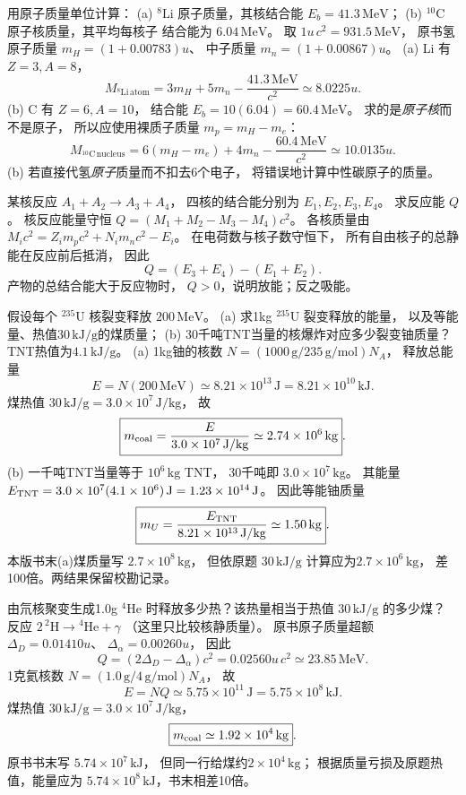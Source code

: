 用原子质量单位计算：
(a) $\mathrm{^{8}Li}$ 原子质量，其核结合能
$E_b=41.3\,\mathrm{MeV}$；
(b) $\mathrm{^{10}C}$ 原子核质量，其平均每核子
结合能为 $6.04\,\mathrm{MeV}$。
\exsolution
取 $1u\,c^2=931.5\,\mathrm{MeV}$，
原书氢原子质量 $m_H=(1+0.00783)u$、
中子质量 $m_n=(1+0.00867)u$。
(a) Li 有 $Z=3,A=8$，
\[
 \boxed{M_{\mathrm{^{8}Li\,atom}}=
 3m_H+5m_n-\frac{41.3\,\mathrm{MeV}}{c^2}
 \simeq8.0225u}.
\]
(b) C 有 $Z=6,A=10$，
结合能 $E_b=10(6.04)=60.4\,\mathrm{MeV}$。
求的是\emph{原子核}而不是原子，
所以应使用裸质子质量
$m_p=m_H-m_e$：
\[
 \boxed{M_{\mathrm{^{10}C\,nucleus}}=
 6(m_H-m_e)+4m_n-\frac{60.4\,\mathrm{MeV}}{c^2}
 \simeq10.0135u}.
\]
\excheck (b) 若直接代氢\emph{原子}质量而不扣去6个电子，
将错误地计算中性碳原子的质量。

某核反应
$A_1+A_2\to A_3+A_4$，
四核的结合能分别为 $E_1,E_2,E_3,E_4$。
求反应能 $Q$。
\exsolution
核反应能量守恒
$Q=(M_1+M_2-M_3-M_4)c^2$。
各核质量由
$M_ic^2=Z_im_pc^2+N_im_nc^2-E_i$。
在电荷数与核子数守恒下，
所有自由核子的总静能在反应前后抵消，
因此
\[
 \boxed{Q=(E_3+E_4)-(E_1+E_2)}.
\]
\excheck 产物的总结合能大于反应物时，
$Q>0$，说明放能；反之吸能。

假设每个 $\mathrm{^{235}U}$ 核裂变释放
$200\,\mathrm{MeV}$。
(a) 求1kg $\mathrm{^{235}U}$ 裂变释放的能量，
以及等能量、热值$30\,\mathrm{kJ/g}$的煤质量；
(b) 30千吨TNT当量的核爆炸对应多少裂变铀质量？
TNT热值为$4.1\,\mathrm{kJ/g}$。
\exsolution
(a) 1kg铀的核数
$N=(1000\,\mathrm g/235\,\mathrm{g/mol})N_A$，
释放总能量
\[
 \boxed{E=N(200\,\mathrm{MeV})
 \simeq8.21\times10^{13}\,\mathrm J
 =8.21\times10^{10}\,\mathrm{kJ}}.
\]
煤热值
$30\,\mathrm{kJ/g}=3.0\times10^7\,\mathrm{J/kg}$，
故
\[
 \boxed{m_{\rm coal}=
 \frac E{3.0\times10^7\,\mathrm{J/kg}}
 \simeq2.74\times10^6\,\mathrm{kg}}.
\]
(b) 一千吨TNT当量等于 $10^6\,\mathrm{kg}$ TNT，
30千吨即 $3.0\times10^7\,\mathrm{kg}$。
其能量
$E_{\rm TNT}=3.0\times10^7(4.1\times10^6)\,\mathrm J
=1.23\times10^{14}\,\mathrm J$。
因此等能铀质量
\[
 \boxed{m_U=\frac{E_{\rm TNT}}
 {8.21\times10^{13}\,\mathrm{J/kg}}
 \simeq1.50\,\mathrm{kg}}.
\]
\excheck 本版书末(a)煤质量写
$2.7\times10^8\,\mathrm{kg}$，
但依原题 $30\,\mathrm{kJ/g}$
计算应为$2.7\times10^6\,\mathrm{kg}$，
差100倍。两结果保留校勘记录。

由氘核聚变生成1.0g $\mathrm{^{4}He}$
时释放多少热？该热量相当于热值
$30\,\mathrm{kJ/g}$ 的多少煤？
\exsolution
反应
$2\,\mathrm{^{2}H}\to\mathrm{^{4}He}+\gamma$
（这里只比较核静质量）。
原书原子质量超额
$\Delta_D=0.01410u$、
$\Delta_\alpha=0.00260u$，
因此
\[
 Q=(2\Delta_D-\Delta_\alpha)c^2
 =0.02560u\,c^2
 \simeq23.85\,\mathrm{MeV}.
\]
1克氦核数
$N=(1.0\,\mathrm g/4\,\mathrm{g/mol})N_A$，
故
\[
 \boxed{E=NQ\simeq5.75\times10^{11}\,\mathrm J
 =5.75\times10^8\,\mathrm{kJ}}.
\]
煤热值
$30\,\mathrm{kJ/g}=3.0\times10^7\,\mathrm{J/kg}$，
\[
 \boxed{m_{\rm coal}\simeq1.92\times10^4\,\mathrm{kg}}.
\]
\excheck 原书书末写
$5.74\times10^7\,\mathrm{kJ}$，
但同一行给煤约$2\times10^4\,\mathrm{kg}$；
根据质量亏损及原题热值，能量应为
$5.74\times10^8\,\mathrm{kJ}$，书末相差10倍。

